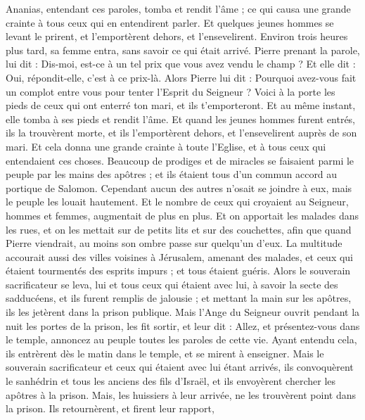 \begin{multicols}{2}
Ananias, entendant ces paroles, tomba et rendit l'âme ; ce qui causa une grande crainte à tous ceux qui en entendirent parler.
Et quelques jeunes hommes se levant le prirent, et l'emportèrent dehors, et l’ensevelirent.
Environ trois heures plus tard, sa femme entra, sans savoir ce qui était arrivé.
Pierre prenant la parole, lui dit : Dis-moi, est-ce à un tel prix que vous avez vendu le champ ? Et elle dit : Oui, répondit-elle, c’est à ce prix-là.
Alors Pierre lui dit : Pourquoi avez-vous fait un complot entre vous pour tenter l'Esprit du Seigneur ? Voici à la porte les pieds de ceux qui ont enterré ton mari, et ils t'emporteront.
Et au même instant, elle tomba à ses pieds et rendit l'âme. Et quand les jeunes hommes furent entrés, ils la trouvèrent morte, et ils l'emportèrent dehors, et l’ensevelirent auprès de son mari.
Et cela donna une grande crainte à toute l'Eglise, et à tous ceux qui entendaient ces choses.
Beaucoup de prodiges et de miracles se faisaient parmi le peuple par les mains des apôtres ; et ils étaient tous d'un commun accord au portique de Salomon.
Cependant aucun des autres n'osait se joindre à eux, mais le peuple les louait hautement.
Et le nombre de ceux qui croyaient au Seigneur, hommes et femmes, augmentait de plus en plus.
Et on apportait les malades dans les rues, et on les mettait sur de petits lits et sur des couchettes, afin que quand Pierre viendrait, au moins son ombre passe sur quelqu'un d'eux.
La multitude accourait aussi des villes voisines à Jérusalem, amenant des malades, et ceux qui étaient tourmentés des esprits impurs ; et tous étaient guéris.
Alors le souverain sacrificateur se leva, lui et tous ceux qui étaient avec lui, à savoir la secte des sadducéens, et ils furent remplis de jalousie ;
et mettant la main sur les apôtres, ils les jetèrent dans la prison publique.
Mais l’Ange du Seigneur ouvrit pendant la nuit les portes de la prison, les fit sortir, et leur dit :
Allez, et présentez-vous dans le temple, annoncez au peuple toutes les paroles de cette vie.
Ayant entendu cela, ils entrèrent dès le matin dans le temple, et se mirent à enseigner. Mais le souverain sacrificateur et ceux qui étaient avec lui étant arrivés, ils convoquèrent le sanhédrin et tous les anciens des fils d'Israël, et ils envoyèrent chercher les apôtres à la prison.
Mais, les huissiers à leur arrivée, ne les trouvèrent point dans la prison. Ils retournèrent, et firent leur rapport,

\end{multicols}
